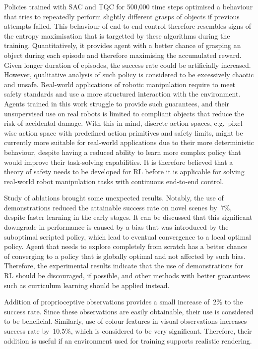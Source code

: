 Policies trained with SAC and TQC for 500,000 time steps optimised a behaviour that tries to repeatedly perform slightly different grasps of objects if previous attempts failed. This behaviour of end-to-end control therefore resembles signs of the entropy maximisation that is targetted by these algorithms during the training. Quantitatively, it provides agent with a better chance of grasping an object during each episode and therefore maximising the accumulated reward. Given longer duration of episodes, the success rate could be artificially increased. However, qualitative analysis of such policy is considered to be excessively chaotic and unsafe. Real-world applications of robotic manipulation require to meet safety standards and use a more structured interaction with the environment. Agents trained in this work struggle to provide such guarantees, and their unsupervised use on real robots is limited to compliant objects that reduce the risk of accidental damage. With this in mind, discrete action spaces, e.g.~pixel-wise action space with predefined action primitives and safety limits, might be currently more suitable for real-world applications due to their more deterministic behaviour, despite having a reduced ability to learn more complex policy that would improve their task-solving capabilities. It is therefore believed that a theory of safety needs to be developed for RL before it is applicable for solving real-world robot manipulation tasks with continuous end-to-end control.

Study of ablations brought some unexpected results. Notably, the use of demonstrations reduced the attainable success rate on novel scenes by~7\%, despite faster learning in the early stages. It can be discussed that this significant downgrade in performance is caused by a bias that was introduced by the suboptimal scripted policy, which lead to eventual convergence to a local optimal policy. Agent that needs to explore completely from scratch has a better chance of converging to a policy that is globally optimal and not affected by such bias. Therefore, the experimental results indicate that the use of demonstrations for RL should be discouraged, if possible, and other methods with better guarantees such as curriculum learning should be applied instead.

Addition of proprioceptive observations provides a small increase of~2\% to the success rate. Since these observations are easily obtainable, their use is considered to be beneficial. Similarly, use of colour features in visual observations increases success rate by~10.5\%, which is considered to be very significant. Therefore, their addition is useful if an environment used for training supports realistic rendering.


